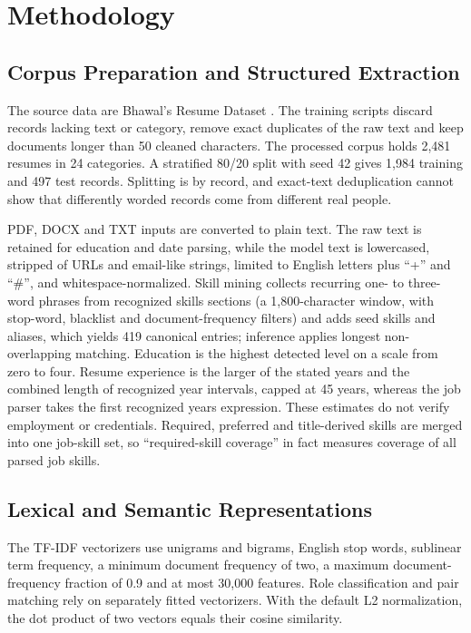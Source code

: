 \documentclass[conference]{IEEEtran}
\begin{document}
\section{Methodology}
\subsection{Corpus Preparation and Structured Extraction}
The source data are Bhawal's Resume Dataset \cite{b14}. The training scripts discard records lacking text or category, remove exact duplicates of the raw text and keep documents longer than 50 cleaned characters. The processed corpus holds 2,481 resumes in 24 categories. A stratified 80/20 split with seed 42 gives 1,984 training and 497 test records. Splitting is by record, and exact-text deduplication cannot show that differently worded records come from different real people.

PDF, DOCX and TXT inputs are converted to plain text. The raw text is retained for education and date parsing, while the model text is lowercased, stripped of URLs and email-like strings, limited to English letters plus ``+'' and ``\#'', and whitespace-normalized. Skill mining collects recurring one- to three-word phrases from recognized skills sections (a 1,800-character window, with stop-word, blacklist and document-frequency filters) and adds seed skills and aliases, which yields 419 canonical entries; inference applies longest non-overlapping matching. Education is the highest detected level on a scale from zero to four. Resume experience is the larger of the stated years and the combined length of recognized year intervals, capped at 45 years, whereas the job parser takes the first recognized years expression. These estimates do not verify employment or credentials. Required, preferred and title-derived skills are merged into one job-skill set, so ``required-skill coverage'' in fact measures coverage of all parsed job skills.

\subsection{Lexical and Semantic Representations}
The TF-IDF vectorizers use unigrams and bigrams, English stop words, sublinear term frequency, a minimum document frequency of two, a maximum document-frequency fraction of 0.9 and at most 30,000 features. Role classification and pair matching rely on separately fitted vectorizers. With the default L2 normalization, the dot product of two vectors equals their cosine similarity.
\end{document}
